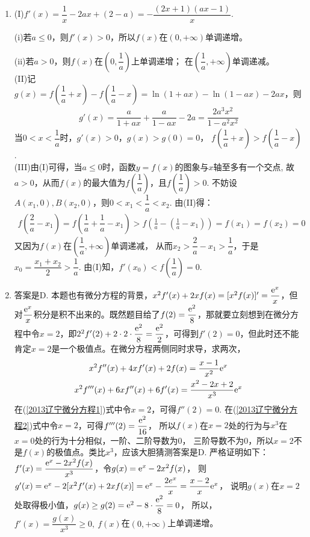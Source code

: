 \begin{enumerate}[label={\textbf{\arabic*.}},leftmargin=
    \inteval{\myenumleftmargin}pt]
\item (I)$ f'(x)=\dfrac{1}{x}-2ax+(2-a)=-\dfrac{(2x+1)(ax-1)}{x} $. 

(i)若$a\leqslant 0$，则$f'(x)>0$，所以$f(x)$在$(0,+\infty)$单调递增。

(ii)若$a>0$，则$ f(x) $在$ \left(0,\dfrac{1}{a}\right) $上单调递增；
在$\left(\dfrac{1}{a},+\infty\right)$单调递减。\\
(II)记$g(x)=f\left(\dfrac{1}{a}+x\right)-f\left(\dfrac{1}{a}-x\right)
=\ln(1+ax)-\ln(1-ax)-2ax $，则
\begin{gather*}
    g'(x)=\dfrac{a}{1+ax}+\dfrac{a}{1-ax}-2a=\dfrac{2a^{3}x^{2}}{1-a^{2}x^{2}}
\end{gather*}
当$0<x<\dfrac{1}{a}$时，$g'(x)>0$，$ g(x)>g(0)=0 $，
$f\left(\dfrac{1}{a}+x\right)>f\left(\dfrac{1}{a}-x\right)$.\\
(III)由(I)可得，当$a\leqslant0$时，函数$y=f(x)$的图象与$x$轴至多有一个交点,
故$a>0$，从而$f(x)$的最大值为$f\left(\dfrac{1}{a}\right)$，且$f\left(\dfrac{1}{a}\right)>0$.
不妨设$A\left(x_{1},0\right),B\left(x_{2},0\right)$，则$0<x_{1}<\dfrac{1}{a}<x_{2}$.
由(II)得：
\begin{gather*}
    f\left(\dfrac{2}{a}-x_{1}\right)=f\left(\dfrac{1}{a}+\dfrac{1}{a}-x_{1}\right)
    >f\left(\frac{1}{a}-\left(\frac{1}{a}-x_{1}\right)\right)=
    f\left(x_{1}\right)=f\left(x_{2}\right)=0
\end{gather*}
又因为$f(x)$在$\left(\dfrac{1}{a},+\infty\right)$单调递减，
从而$x_{2}>\dfrac{2}{a}-x_{1}>\dfrac{1}{a} $，于是$x_{0}=\dfrac{x_{1}+x_{2}}{2}>\dfrac{1}{a}$.
由(I)知，$f'\left(x_{0}\right)<f\left(\dfrac{1}{a}\right)=0 $.

\item  
答案是D. 本题也有微分方程的背景，$ x^2f'(x)+2xf(x)=[x^2f(x)]'=\dfrac{\mathrm{e}^x}{x} $，但对$ \dfrac{\mathrm{e}^x}{x} $积分是积不出来的。既然题目给了$ f(2)=\dfrac{\mathrm{e}^2}{8} $，那就要立刻想到在微分方程中令$ x=2 $，即$ 2^2f'(2)+2\cdot 2\cdot \dfrac{\mathrm{e}^2}{8}=\dfrac{\mathrm{e}^2}{2} $，可得到$ f'(2)=0 $，但此时还不能肯定$ x=2 $是一个极值点。在微分方程两侧同时求导，求两次，
\begin{gather}
    x^2f''(x)+4xf'(x)+2f(x)=\dfrac{x-1}{x^2}\mathrm{e}^x \label{2013辽宁微分方程1} \\
    x^2f'''(x)+6xf''(x)+6f'(x)=\dfrac{x^2-2x+2}{x^3}\mathrm{e}^x  \label{2013辽宁微分方程2}
\end{gather}
在(\ref{2013辽宁微分方程1})式中令$ x=2 $，可得$ f''(2)=0 $. 
在(\ref{2013辽宁微分方程2})式中令$ x=2 $，可得$ f'''(2)=\dfrac{\mathrm{e}^2}{16} $，
所以$ f(x) $在$ x=2 $处的行为与$ x^3 $在$ x=0 $处的行为十分相似，一阶、二阶导数为0，
三阶导数不为0，所以$ x=2 $不是$ f(x) $的极值点。类比$ x^3 $，应该大胆猜测答案是D.
严格证明如下：$ f'(x)=\dfrac{\mathrm{e}^x-2x^2f(x)}{x^3} $，令$ g(x)=\mathrm{e}^x-2x^2f(x) $，
则$ g'(x)=\mathrm{e}^x-2[x^2f'(x)+2xf(x)]=\mathrm{e}^x-\dfrac{2e^x}{x}=\dfrac{x-2}{x}\mathrm{e}^x $，
说明$ g(x) $在$ x=2 $处取得极小值，$ g(x)\geq g(2)=\mathrm{e}^2-8\cdot \dfrac{\mathrm{e}^2}{8}=0 $，
所以，$ f'(x)=\dfrac{g(x)}{x^3}\geq 0,\ f(x) $在$ (0,+\infty) $上单调递增。


\end{enumerate}
